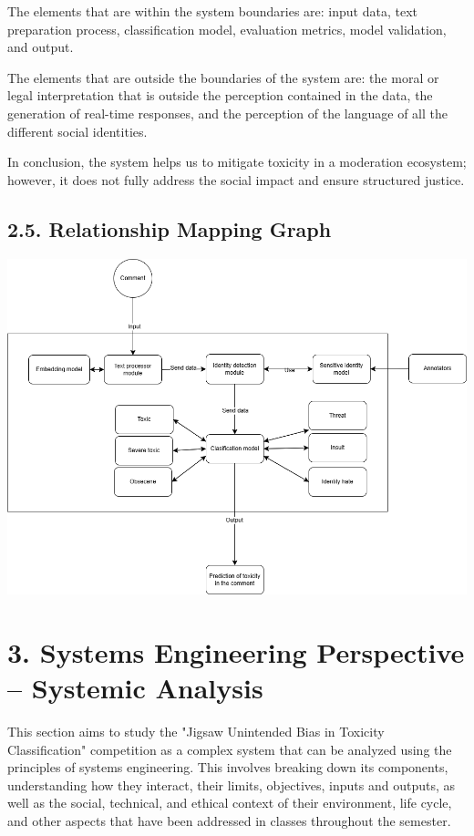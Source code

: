 \documentclass[a4paper,12pt]{article}
\begin{document}
The elements that are within the system boundaries are: input data, text preparation process, classification model, evaluation metrics, model validation, and output.

The elements that are outside the boundaries of the system are: the moral or legal interpretation that is outside the perception contained in the data, the generation of real-time responses, and the perception of the language of all the different social identities.

In conclusion, the system helps us to mitigate toxicity in a moderation ecosystem; however, it does not fully address the social impact and ensure structured justice.

\subsection*{2.5. Relationship Mapping Graph}
\includegraphics[width=15cm]{img/mapeoRelaciones2.drawio.png}\\[0.5cm]
\section*{3. Systems Engineering Perspective – Systemic Analysis}

This section aims to study the "Jigsaw Unintended Bias in Toxicity Classification" competition as a complex system that can be analyzed using the principles of systems engineering. This involves breaking down its components, understanding how they interact, their limits, objectives, inputs and outputs, as well as the social, technical, and ethical context of their environment, life cycle, and other aspects that have been addressed in classes throughout the semester.
\end{document}
